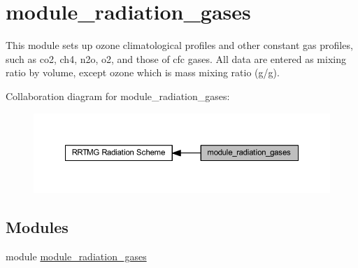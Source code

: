 \hypertarget{group__module__radiation__gases}{}\section{module\+\_\+radiation\+\_\+gases}
\label{group__module__radiation__gases}


This module sets up ozone climatological profiles and other constant gas profiles, such as co2, ch4, n2o, o2, and those of cfc gases. All data are entered as mixing ratio by volume, except ozone which is mass mixing ratio (g/g).  


Collaboration diagram for module\+\_\+radiation\+\_\+gases\+:\nopagebreak
\begin{figure}[H]
\begin{center}
\leavevmode
\includegraphics[width=350pt]{group__module__radiation__gases}
\end{center}
\end{figure}
\subsection*{Modules}
\begin{DoxyCompactItemize}
\item 
module \hyperlink{namespacemodule__radiation__gases}{module\+\_\+radiation\+\_\+gases}
\end{DoxyCompactItemize}

